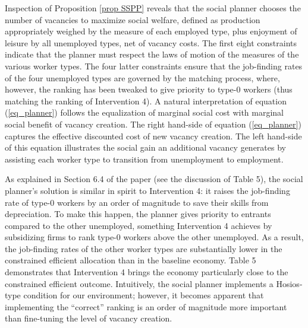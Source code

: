 \documentclass[12pt]{article} %
\theoremstyle{definition}
\begin{document}
Inspection of Proposition \ref{prop SSPP} reveals that the social planner chooses the number of vacancies to maximize social welfare, defined as production appropriately weighed by the measure of each employed type, plus enjoyment of leisure by all unemployed types, net of vacancy costs. The first eight constraints indicate that the planner must respect the laws of motion of the measures of the various worker types. The four latter constraints ensure that the 
job-finding rates of the four unemployed types are governed by the \cite{petrongolo2001looking} matching process, where, however, the ranking has been tweaked to give priority to type-0 workers (thus matching the ranking of Intervention 4). A natural interpretation of equation (\ref{eq_planner}) follows the equalization of marginal social cost with marginal social benefit of vacancy creation.
The right hand-side of equation (\ref{eq_planner}) captures the effective discounted cost of new vacancy creation.
The left hand-side of this equation illustrates the social gain an additional vacancy generates by assisting each worker type to transition from unemployment to employment.

As explained in Section 6.4 of the paper (see the discussion of Table 5),  %
the social planner's solution is similar in spirit to Intervention 4: it raises the job-finding rate of type-0 workers by an order of magnitude to save their skills from depreciation.
To make this happen, the planner gives priority to entrants compared to the other unemployed, something Intervention 4 achieves by subsidizing firms to rank type-0 workers above the other unemployed. As a result, the job-finding rates of the other worker types are substantially lower in the constrained efficient allocation than in the baseline economy.
Table 5 demonstrates that Intervention 4 brings the economy particularly close to the constrained efficient outcome. 
Intuitively, the social planner implements a Hosios-type condition for our environment; however, it becomes apparent that implementing the ``correct'' ranking is an order of magnitude more important than fine-tuning the level of vacancy creation.








\end{document}
